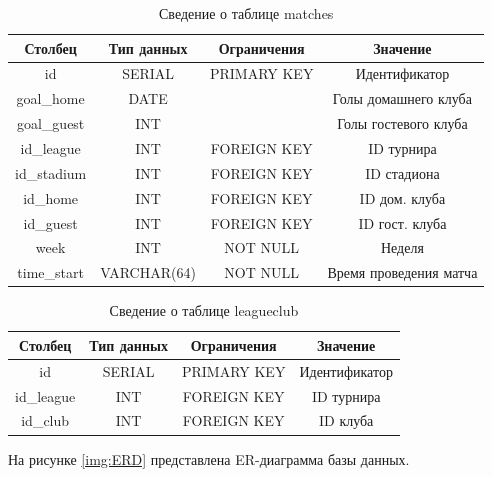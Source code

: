 \begin{table}[H]
	\begin{center}
		\caption{Сведение о таблице matches}
		\begin{tabular}{|c|c|c|c|}
			\hline
			Столбец & Тип данных & Ограничения & Значение \\
			\hline
			id & SERIAL & PRIMARY KEY & Идентификатор \\
			\hline
			goal\_home & DATE &  & Голы домашнего клуба \\
			\hline
			goal\_guest & INT &  & Голы гостевого клуба \\
			\hline
			id\_league & INT & FOREIGN KEY & ID турнира \\
			\hline
			id\_stadium & INT & FOREIGN KEY & ID стадиона \\
			\hline
			id\_home & INT & FOREIGN KEY & ID дом. клуба \\
			\hline
			id\_guest & INT & FOREIGN KEY & ID гост. клуба \\
			\hline
			week & INT & NOT NULL & Неделя \\
			\hline
			time\_start & VARCHAR(64) & NOT NULL & Время проведения матча \\
			\hline						
		\end{tabular}
		\label{table:db:match}
	\end{center}
\end{table}

\begin{table}[H]
	\begin{center}
		\caption{Сведение о таблице leagueclub}
		\begin{tabular}{|c|c|c|c|}
			\hline
			Столбец & Тип данных & Ограничения & Значение \\
			\hline
			id & SERIAL & PRIMARY KEY & Идентификатор \\
			\hline
			id\_league & INT & FOREIGN KEY & ID турнира \\
			\hline
			id\_club & INT & FOREIGN KEY & ID клуба \\
			\hline
		\end{tabular}
		\label{table:db:leagueclub}
	\end{center}
\end{table}
\clearpage
На рисунке \ref{img:ERD} представлена ER-диаграмма базы данных.

